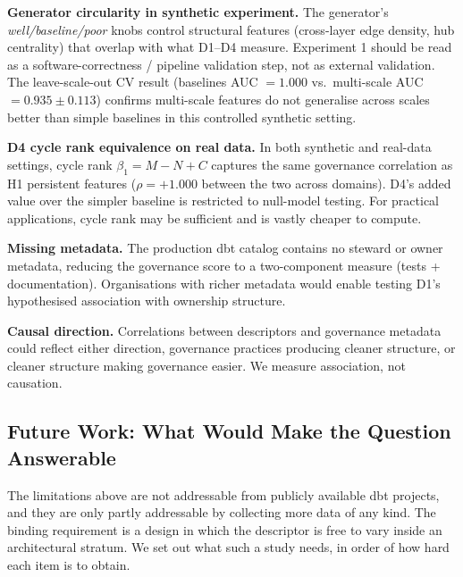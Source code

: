 \documentclass[11pt,a4paper]{article}
\begin{document}
\textbf{Generator circularity in synthetic experiment.} The generator's
\textit{well/baseline/poor} knobs control structural features (cross-layer
edge density, hub centrality) that overlap with what D1--D4 measure.
Experiment 1 should be read as a software-correctness / pipeline
validation step, not as external validation. The leave-scale-out CV
result (baselines AUC $= 1.000$ vs.\ multi-scale AUC $= 0.935 \pm 0.113$)
confirms multi-scale features do not generalise across scales better
than simple baselines in this controlled synthetic setting.

\textbf{D4 cycle rank equivalence on real data.} In both synthetic and
real-data settings, cycle rank $\beta_1 = M - N + C$ captures the same
governance correlation as H1 persistent features ($\rho = +1.000$ between
the two across domains). D4's added value over the simpler baseline is
restricted to null-model testing. For practical applications, cycle rank
may be sufficient and is vastly cheaper to compute.

\textbf{Missing metadata.} The production dbt catalog contains no
steward or owner metadata, reducing the governance score to a
two-component measure (tests + documentation). Organisations with
richer metadata would enable testing D1's hypothesised association
with ownership structure.

\textbf{Causal direction.} Correlations between descriptors and
governance metadata could reflect either direction, governance practices
producing cleaner structure, or cleaner structure making governance
easier. We measure association, not causation.

\subsection{Future Work: What Would Make the Question Answerable}
\label{sec:futurework}

The limitations above are not addressable from publicly available dbt
projects, and they are only partly addressable by collecting more data
of any kind. The binding requirement is a design in which the descriptor
is free to vary inside an architectural stratum. We set out what such a
study needs, in order of how hard each item is to obtain.
\end{document}
